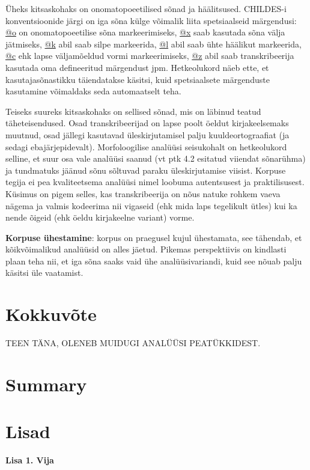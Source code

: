 \documentclass[12pt]{article}
\begin{document}
Üheks kitsaskohaks on onomatopoeetilised sõnad ja häälitsused. CHILDES-i konventsioonide järgi on iga sõna külge võimalik liita spetsiaalseid märgendusi: \underline{@o} on onomatopoeetilise sõna markeerimiseks, \underline{@x} saab kasutada sõna välja jätmiseks, \underline{@k} abil saab silpe markeerida, \underline{@l} abil saab ühte häälikut markeerida, \underline{@c} ehk lapse väljamõeldud vormi markeerimiseks, \underline{@z} abil saab transkribeerija kasutada oma defineeritud märgendust jpm. Hetkeolukord näeb ette, et kasutajasõnastikku täiendatakse käsitsi, kuid spetsiaalsete märgenduste kasutamine võimaldaks seda automaatselt teha.

Teiseks suureks kitsaskohaks on sellised sõnad, mis on läbinud teatud täheteisendused. Osad transkribeerijad on lapse poolt öeldut kirjakeelsemaks muutnud, osad jällegi kasutavad üleskirjutamisel palju kuuldeortograafiat (ja sedagi ebajärjepidevalt). Morfoloogilise analüüsi seisukohalt on hetkeolukord selline, et suur osa vale analüüsi saanud (vt ptk 4.2 esitatud viiendat sõnarühma) ja tundmatuks jäänud sõnu sõltuvad paraku üleskirjutamise viisist. Korpuse tegija ei pea kvaliteetsema analüüsi nimel loobuma autentsusest ja praktilisusest. Küsimus on pigem selles, kas transkribeerija on nõus natuke rohkem vaeva nägema ja valmis kodeerima nii vigaseid (ehk mida laps tegelikult ütles) kui ka nende õigeid (ehk öeldu kirjakeelne variant) vorme.


\textbf{Korpuse ühestamine}: korpus on praegusel kujul ühestamata, see tähendab, et kõikvõimalikud analüüsid on alles jäetud. Pikemas perspektiivis on kindlasti plaan teha nii, et iga sõna saaks vaid ühe analüüsivariandi, kuid see nõuab palju käsitsi üle vaatamist.


\newpage
{}
\section*{Kokkuvõte}
TEEN TÄNA, OLENEB MUIDUGI ANALÜÜSI PEATÜKKIDEST.

\newpage
{}
\section*{Summary}

\newpage
{}
\section*{Lisad}
\textbf{Lisa 1. Vija}
\end{document}
